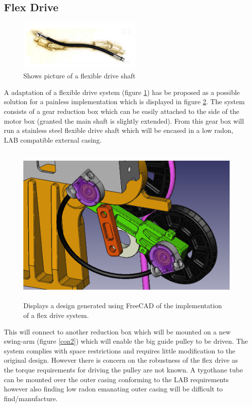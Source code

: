 \documentclass[paper=a4, fontsize=11pt]{scrartcl}
\numberwithin{equation}{section}		%
\numberwithin{figure}{section}			%
\numberwithin{table}{section}				%
\begin{document}
\subsection{Flex Drive}
\begin{figure}[H]
                \includegraphics[height=2.5cm]{ag2}
                \caption{Shows picture of a flexible drive shaft \cite{p1}}
				\label{flex}
        \end{figure}
A adaptation of a flexible drive system (figure \ref{flex}) has be proposed as a possible solution for a painless implementation which is displayed in figure \ref{cadf}. The system consists of a gear reduction box which can be easily attached to the side of the motor box (granted the main shaft is slightly extended). From this gear box will run a stainless steel flexible drive shaft which will be encased in a low radon, LAB compatible external casing. 
    \begin{figure}[H]
                \includegraphics[height=8cm]{newurm1}
                \caption{Displays a design generated using FreeCAD of the implementation of a flex drive system.}
				\label{cadf}
        \end{figure}
        This will connect to another reduction box which will be mounted on a new swing-arm (figure \ref{con2}) which will enable the big guide pulley to be driven. The system complies with space restrictions and requires little modification to the original design. However there is concern on the robustness of the flex drive as the torque requirements for driving the pulley are not known. A tygothane tube can be mounted over the outer casing conforming to the LAB requirements however also finding low radon emanating outer casing will be difficult to find/manufacture.
\end{document}

